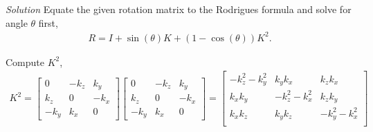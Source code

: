 \documentclass{article}
\numberwithin{prob}{section}
\newenvironment{solution}{\emph{Solution}}{}
\begin{document}
\begin{solution}
Equate the given rotation matrix to the Rodrigues formula and solve for angle $\theta$ first,
\begin{align}
  R = I + \sin(\theta) K + (1-\cos(\theta)) K^2.
\end{align}

Compute $K^2$,
\begin{align}
  K^2 = \begin{bmatrix}
    0 & -k_z & k_y\\
    k_z & 0 & -k_x\\
    -k_y & k_x & 0
  \end{bmatrix}
  \begin{bmatrix}
    0 & -k_z & k_y\\
    k_z & 0 & -k_x\\
    -k_y & k_x & 0
  \end{bmatrix}
  = \begin{bmatrix}
    -k_z^2 - k_y^2 & k_y k_x & k_z k_x \\
    k_x k_y & -k_z^2 - k_x^2 & k_z k_y \\
    k_x k_z &  k_y k_z & -k_y^2 - k_x^2\\
  \end{bmatrix}
\end{align}


\end{solution}
\end{document}

